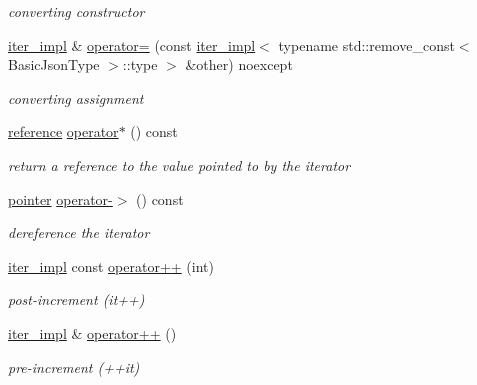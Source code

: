 \begin{DoxyCompactItemize}
\begin{DoxyCompactList}\small\item\em converting constructor \end{DoxyCompactList}\item 
\mbox{\hyperlink{classnlohmann_1_1detail_1_1iter__impl}{iter\+\_\+impl}} \& \mbox{\hyperlink{classnlohmann_1_1detail_1_1iter__impl_a7159ed1cfe7c423a2baef8bea0c94509}{operator=}} (const \mbox{\hyperlink{classnlohmann_1_1detail_1_1iter__impl}{iter\+\_\+impl}}$<$ typename std\+::remove\+\_\+const$<$ Basic\+Json\+Type $>$\+::type $>$ \&other) noexcept
\begin{DoxyCompactList}\small\item\em converting assignment \end{DoxyCompactList}\item 
\mbox{\hyperlink{classnlohmann_1_1detail_1_1iter__impl_a5be8001be099c6b82310f4d387b953ce}{reference}} \mbox{\hyperlink{classnlohmann_1_1detail_1_1iter__impl_a5ca57856d9bba54a5fc51cee891de827}{operator$\ast$}} () const
\begin{DoxyCompactList}\small\item\em return a reference to the value pointed to by the iterator \end{DoxyCompactList}\item 
\mbox{\hyperlink{classnlohmann_1_1detail_1_1iter__impl_a69e52f890ce8c556fd68ce109e24b360}{pointer}} \mbox{\hyperlink{classnlohmann_1_1detail_1_1iter__impl_a6da3d2b34528aff328f3dcb513076dec}{operator-\/$>$}} () const
\begin{DoxyCompactList}\small\item\em dereference the iterator \end{DoxyCompactList}\item 
\mbox{\hyperlink{classnlohmann_1_1detail_1_1iter__impl}{iter\+\_\+impl}} const \mbox{\hyperlink{classnlohmann_1_1detail_1_1iter__impl_a7d2397773b2dce42f30f0375a6a1d850}{operator++}} (int)
\begin{DoxyCompactList}\small\item\em post-\/increment (it++) \end{DoxyCompactList}\item 
\mbox{\hyperlink{classnlohmann_1_1detail_1_1iter__impl}{iter\+\_\+impl}} \& \mbox{\hyperlink{classnlohmann_1_1detail_1_1iter__impl_abdfe2a7f464400a7ab572782d14b922f}{operator++}} ()
\begin{DoxyCompactList}\small\item\em pre-\/increment (++it) \end{DoxyCompactList}\item 

\end{DoxyCompactItemize}
